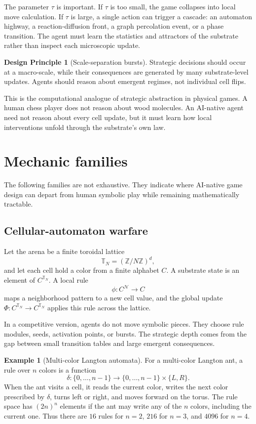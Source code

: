\documentclass[11pt,a4paper]{article}
\theoremstyle{plain}
\theoremstyle{definition}
\newtheorem{principle}[theorem]{Design Principle}
\newtheorem{example}[theorem]{Example}
\newcommand{\T}{\mathbb{T}}
\begin{document}
The parameter $\tau$ is important. If $\tau$ is too small, the game collapses into local move calculation. If $\tau$ is large, a single action can trigger a cascade: an automaton highway, a reaction-diffusion front, a graph percolation event, or a phase transition. The agent must learn the statistics and attractors of the substrate rather than inspect each microscopic update.

\begin{principle}[Scale-separation bursts]\label{prin:bursts}
Strategic decisions should occur at a macro-scale, while their consequences are generated by many substrate-level updates. Agents should reason about emergent regimes, not individual cell flips.
\end{principle}

This is the computational analogue of strategic abstraction in physical games. A human chess player does not reason about wood molecules. An AI-native agent need not reason about every cell update, but it must learn how local interventions unfold through the substrate's own law.

\section{Mechanic families}\label{sec:mechanics}

The following families are not exhaustive. They indicate where AI-native game design can depart from human symbolic play while remaining mathematically tractable.

\subsection{Cellular-automaton warfare}\label{subsec:ca}

Let the arena be a finite toroidal lattice
\[
  \T_N=(\mathbb{Z}/N\mathbb{Z})^d,
\]
and let each cell hold a color from a finite alphabet $C$. A substrate state is an element of $C^{\T_N}$. A local rule
\[
  \phi:C^{\mathcal{N}}\to C
\]
maps a neighborhood pattern to a new cell value, and the global update $\Phi:C^{\T_N}\to C^{\T_N}$ applies this rule across the lattice.

In a competitive version, agents do not move symbolic pieces. They choose rule modules, seeds, activation points, or bursts. The strategic depth comes from the gap between small transition tables and large emergent consequences.

\begin{example}[Multi-color Langton automata]\label{ex:langton}
For a multi-color Langton ant, a rule over $n$ colors is a function
\[
  \delta:\{0,\ldots,n-1\}\to \{0,\ldots,n-1\}\times\{L,R\}.
\]
When the ant visits a cell, it reads the current color, writes the next color prescribed by $\delta$, turns left or right, and moves forward on the torus. The rule space has $(2n)^n$ elements if the ant may write any of the $n$ colors, including the current one. Thus there are $16$ rules for $n=2$, $216$ for $n=3$, and $4096$ for $n=4$.
\end{example}
\end{document}
